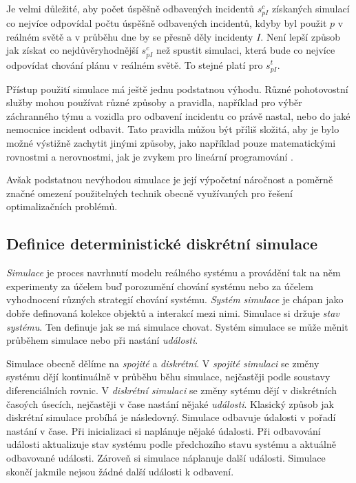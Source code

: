 Je velmi důležité, aby počet úspěšně odbavených incidentů $s^c_{pI}$ získaných simulací co nejvíce odpovídal počtu úspěšně odbavených incidentů,
kdyby byl použit $p$ v reálném světě a v průběhu dne by se přesně děly incidenty $I$.
Není lepší způsob jak získat co nejdůvěryhodnější $s^c_{pI}$ než spustit simulaci, která bude co nejvíce odpovídat chování plánu v reálném světě.
To stejné platí pro $s^t_{pI}$.

Přístup použití simulace má ještě jednu podstatnou výhodu.
Různé pohotovostní služby mohou používat různé způsoby a pravidla, například pro výběr záchranného týmu a vozidla pro odbavení incidentu co právě nastal, nebo do jaké nemocnice incident odbavit.
Tato pravidla můžou být příliš složitá, aby je bylo možné výstižně zachytit jinými způsoby, jako například pouze matematickými rovnostmi a nerovnostmi, jak je zvykem pro lineární programování \cite{LP}.

Avšak podstatnou nevýhodou simulace je její výpočetní náročnost a poměrně značné omezení použitelných technik obecně využívaných pro řešení optimalizačních problémů.

\subsection{Definice deterministické diskrétní simulace}

\textit{Simulace} je proces navrhnutí modelu reálného systému a provádění tak na něm experimenty za účelem buď porozumění chování systému
nebo za účelem vyhodnocení různých strategií chování systému.
\textit{Systém simulace} je chápan jako dobře definovaná kolekce objektů a interakcí mezi nimi.
Simulace si držuje \textit{stav systému}. Ten definuje jak se má simulace chovat.
Systém simulace se může měnit průběhem simulace nebo při nastání \textit{události}.

Simulace obecně dělíme na \textit{spojité} a \textit{diskrétní}.
V \textit{spojité simulaci} se změny systému dějí kontinuálně v průběhu běhu simulace, nejčastěji podle soustavy diferenciálních rovnic.
V \textit{diskrétní simulaci} se změny sytému dějí v diskrétních časoých úsecích, nejčastěji v čase nastání nějaké \textit{události}.
Klasický způsob jak diskrétní simulace probíhá je následovný.
Simulace odbavuje údalosti v pořadí nastání v čase.
Při inicializaci si naplánuje nějaké údalosti.
Při odbavování události aktualizuje stav systému podle předchozího stavu systému a aktuálně odbavované události. Zároveň si simulace náplanuje další události. 
Simulace skončí jakmile nejsou žádné další události k odbavení.

